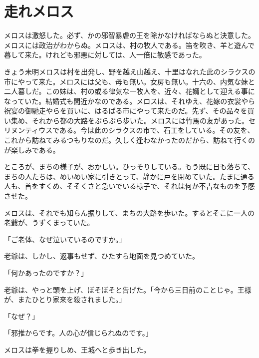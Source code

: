 \documentclass[tate, book, paper=a5, fontsize=10pt]{jlreq}
\begin{document}
\chapter*{走れメロス}
\thispagestyle{plain}

メロスは激怒した。必ず、かの邪智暴虐の王を除かなければならぬと決意した。メロスには政治がわからぬ。メロスは、村の牧人である。笛を吹き、羊と遊んで暮して来た。けれども邪悪に対しては、人一倍に敏感であった。

きょう未明メロスは村を出発し、野を越え山越え、十里はなれた此のシラクスの市にやって来た。メロスには父も、母も無い。女房も無い。十六の、内気な妹と二人暮しだ。この妹は、村の或る律気な一牧人を、近々、花婿として迎える事になっていた。結婚式も間近かなのである。メロスは、それゆえ、花嫁の衣裳やら祝宴の御馳走やらを買いに、はるばる市にやって来たのだ。先ず、その品々を買い集め、それから都の大路をぶらぶら歩いた。メロスには竹馬の友があった。セリヌンティウスである。今は此のシラクスの市で、石工をしている。その友を、これから訪ねてみるつもりなのだ。久しく逢わなかったのだから、訪ねて行くのが楽しみである。

ところが、まちの様子が、おかしい。ひっそりしている。もう既に日も落ちて、まちの人たちは、めいめい家に引きとって、静かに戸を閉めていた。たまに通る人も、首をすくめ、そそくさと急いでいる様子で、それは何か不吉なものを予感させた。

メロスは、それでも知らん振りして、まちの大路を歩いた。するとそこに一人の老爺が、うずくまっていた。

「ご老体、なぜ泣いているのですか。」

老爺は、しかし、返事もせず、ひたすら地面を見つめていた。

「何かあったのですか？」

老爺は、やっと頭を上げ、ぼそぼそと告げた。「今から三日前のことじゃ。王様が、またひとり家来を殺されました。」

「なぜ？」

「邪推からです。人の心が信じられぬのです。」

メロスは拳を握りしめ、王城へと歩き出した。
\end{document}
